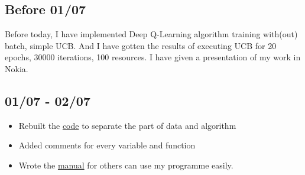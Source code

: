\subsection*{Before 01/07}
Before today, I have implemented Deep Q-Learning algorithm training with(out) batch, simple UCB. And I have gotten the results of executing UCB for 20 epochs, 30000 iterations, 100 resources. I have given a presentation of my work in Nokia.

\subsection*{01/07 - 02/07}
\begin{itemize}
	\item Rebuilt the \href{https://github.com/TryFire/Intership-in-Lri/tree/master/Deep\%20Q-Learning/src}{code} to separate the part of data and algorithm
	\item Added comments for every variable and function
	\item Wrote the \href{https://github.com/TryFire/Intership-in-Lri/blob/master/Deep\%20Q-Learning/manual/DQN\_Manual.pdf}{manual} for others can use my programme easily.
\end{itemize}
